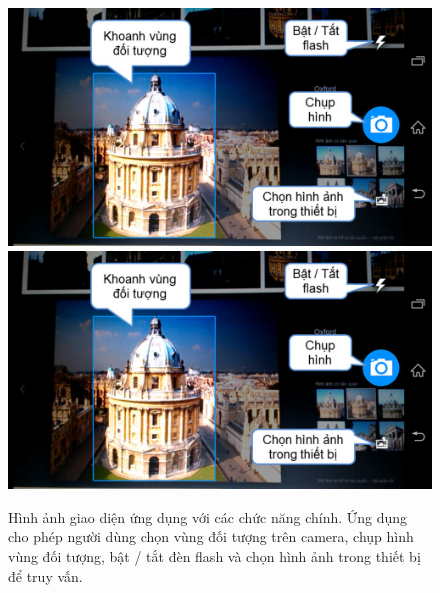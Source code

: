 \begin{figure}[!htbp]
  \begin{center}
    \leavevmode
    \ifpdf
      \includegraphics[scale=0.3]{interface_1}
    \else
      \includegraphics[scale=0.3]{interface_1}
    \fi
    \caption[Hình ảnh ứng dụng với các chức năng chính]{Hình ảnh giao diện ứng dụng với các chức năng chính. Ứng dụng cho phép người dùng chọn vùng đối tượng trên camera, chụp hình vùng đối tượng, bật / tắt đèn flash và chọn hình ảnh trong thiết bị để truy vấn.}
    \label{FigInterface1}
  \end{center}
\end{figure}

